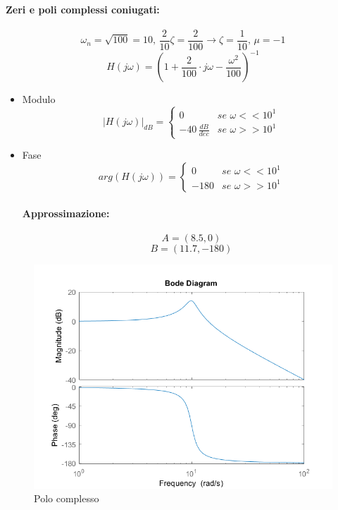 \documentclass[a4paper,oneside,titlepage]{book}
\begin{document}
\paragraph{Zeri e poli complessi coniugati:}
\[ \omega_n=\sqrt{100}=10, \, \frac{2}{10}\zeta=\frac{2}{100} \longrightarrow \zeta=\frac{1}{10}, \, \mu=-1 \]
\[ H(j\omega) = \left( 1 + \frac{2}{100} \cdot j\omega - \frac{\omega^2}{100} \right)^{-1} \]
\begin{itemize}
	\item Modulo
	\[
	|H(j\omega)|_{dB} =
	\begin{cases}
	0& se \,\, \omega << 10^1 \\
	-40 \, \frac{dB}{dec}& se \,\, \omega >> 10^1
	\end{cases}
	\]
	\item Fase
	\[
	arg(H(j\omega)) =
	\begin{cases}
	0& se \,\, \omega << 10^1 \\
	-180& se \,\, \omega >> 10^1
	\end{cases}
	\]
	\paragraph{Approssimazione:}
	\[ A = \left( 8.5, 0 \right) \]
	\[ B = \left( 11.7, -180 \right) \]
\end{itemize}
\begin{figure}[htp]
	\centering
	\includegraphics[scale=0.5]{complessi.png}
	\caption{Polo complesso}
	\label{fig:complessi}
\end{figure}
\newpage
\end{document}
